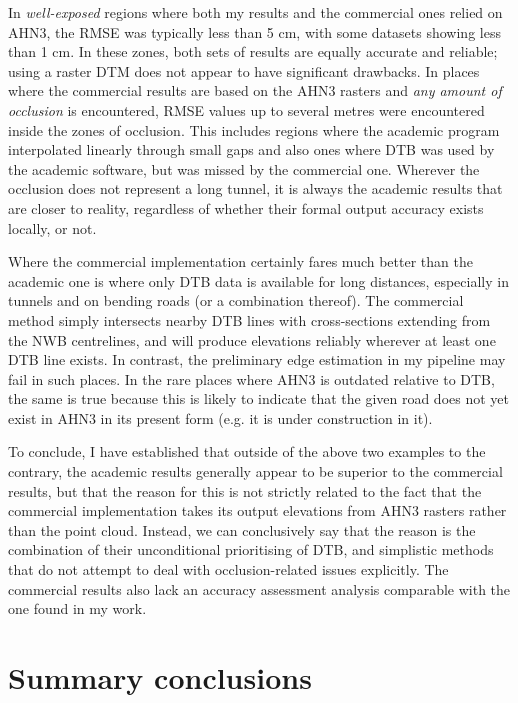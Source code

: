 In \textit{well-exposed} regions where both my results and the commercial ones relied on AHN3, the RMSE was typically less than 5 cm, with some datasets showing less than 1 cm. In these zones, both sets of results are equally accurate and reliable; using a raster DTM does not appear to have significant drawbacks. In places where the commercial results are based on the AHN3 rasters and \textit{any amount of occlusion} is encountered, RMSE values up to several metres were encountered inside the zones of occlusion. This includes regions where the academic program interpolated linearly through small gaps and also ones where DTB was used by the academic software, but was missed by the commercial one. Wherever the occlusion does not represent a long tunnel, it is always the academic results that are closer to reality, regardless of whether their formal output accuracy exists locally, or not.

Where the commercial implementation certainly fares much better than the academic one is where only DTB data is available for long distances, especially in tunnels and on bending roads (or a combination thereof). The commercial method simply intersects nearby DTB lines with cross-sections extending from the NWB centrelines, and will produce elevations reliably wherever at least one DTB line exists. In contrast, the preliminary edge estimation in my pipeline may fail in such places. In the rare places where AHN3 is outdated relative to DTB, the same is true because this is likely to indicate that the given road does not yet exist in AHN3 in its present form (e.g. it is under construction in it).

To conclude, I have established that outside of the above two examples to the contrary, the academic results generally appear to be superior to the commercial results, but that the reason for this is not strictly related to the fact that the commercial implementation takes its output elevations from AHN3 rasters rather than the point cloud. Instead, we can conclusively say that the reason is the combination of their unconditional prioritising of DTB, and simplistic methods that do not attempt to deal with occlusion-related issues explicitly. The commercial results also lack an accuracy assessment analysis comparable with the one found in my work.

\section{Summary conclusions}
\label{sec:conclusions}

